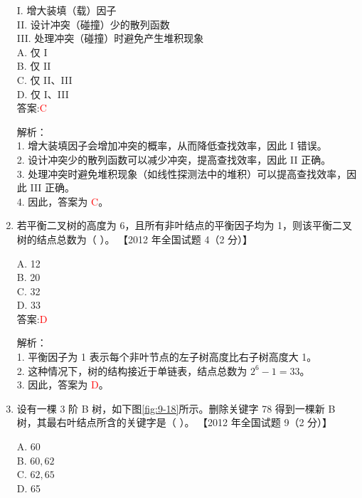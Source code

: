 \documentclass[lang=cn,newtx,10pt,scheme=chinese]{../../../elegantbook}
\begin{document}
\begin{enumerate}
    I. 增大装填（载）因子 \\  
    II. 设计冲突（碰撞）少的散列函数 \\  
    III. 处理冲突（碰撞）时避免产生堆积现象 \\  

    A. 仅 I \\  
    B. 仅 II \\  
    C. 仅 II、III \\  
    D. 仅 I、III \\  

    答案:\textcolor{red}{C}

    解析：\\
    1. 增大装填因子会增加冲突的概率，从而降低查找效率，因此 I 错误。\\
    2. 设计冲突少的散列函数可以减少冲突，提高查找效率，因此 II 正确。\\
    3. 处理冲突时避免堆积现象（如线性探测法中的堆积）可以提高查找效率，因此 III 正确。\\
    4. 因此，答案为 \textcolor{red}{C}。\\

\item 若平衡二叉树的高度为 6，且所有非叶结点的平衡因子均为 1，则该平衡二叉树的结点总数为（ ）。  
    【2012 年全国试题 4（2 分）】  

    A. 12 \\  
    B. 20 \\  
    C. 32 \\  
    D. 33 \\  

    答案:\textcolor{red}{D}

    解析：\\
    1. 平衡因子为 1 表示每个非叶节点的左子树高度比右子树高度大 1。\\
    2. 这种情况下，树的结构接近于单链表，结点总数为 $2^6 - 1 = 33$。\\
    3. 因此，答案为 \textcolor{red}{D}。\\

\item 设有一棵 3 阶 B 树，如下图\ref{fig:9-18}所示。删除关键字 78 得到一棵新 B 树，其最右叶结点所含的关键字是（ ）。  
    【2012 年全国试题 9（2 分）】  

    A. 60 \\  
    B. $60, 62$ \\  
    C. $62, 65$ \\  
    D. 65 \\  


\end{enumerate}
\end{document}

